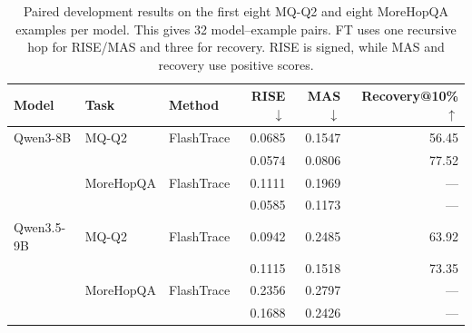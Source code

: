 \begin{table}[htbp]
\centering\small
\caption{Paired development results on the first eight MQ-Q2 and eight MoreHopQA examples per model. This gives 32 model--example pairs. FT uses one recursive hop for RISE/MAS and three for recovery. RISE is signed, while MAS and recovery use positive scores.}
\label{tab:development}
\begin{tabular}{@{}lllrrr@{}}
\toprule
Model & Task & Method & RISE $\downarrow$ & MAS $\downarrow$ & Recovery@10\% $\uparrow$ \\
\midrule
Qwen3-8B & MQ-Q2 & FlashTrace & 0.0685 & 0.1547 & 56.45 \\
 &  & \dt{} & 0.0574 & 0.0806 & 77.52 \\
 & MoreHopQA & FlashTrace & 0.1111 & 0.1969 & --- \\
 &  & \dt{} & 0.0585 & 0.1173 & --- \\
\midrule
Qwen3.5-9B & MQ-Q2 & FlashTrace & 0.0942 & 0.2485 & 63.92 \\
 &  & \dt{} & 0.1115 & 0.1518 & 73.35 \\
 & MoreHopQA & FlashTrace & 0.2356 & 0.2797 & --- \\
 &  & \dt{} & 0.1688 & 0.2426 & --- \\
\bottomrule
\end{tabular}
\end{table}
